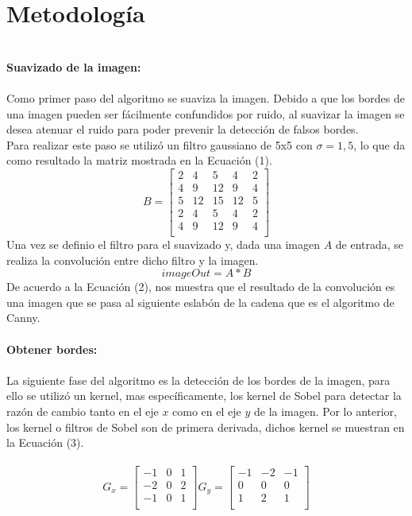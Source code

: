 \documentclass[conference]{IEEEtran}
\begin{document}
\section{Metodolog\'ia}
\textbf{\\ Suavizado de la imagen:\\\\}
Como primer paso del algoritmo se suaviza la imagen. Debido a que los bordes de una imagen pueden ser f\'acilmente confundidos por ruido, al suavizar la imagen se desea atenuar el ruido para poder prevenir la detecci\'on de falsos bordes.\\
Para realizar este paso se utiliz\'o un filtro gaussiano de 5x5 con $\sigma = 1,5$, lo que da como resultado la matriz mostrada en la Ecuaci\'on (1). \\
\begin{equation}
B =
	\begin{bmatrix}
	 2 & 4 & 5 & 4 & 2 \\
	 4 & 9 & 12 & 9 & 4\\
	 5 & 12 & 15 & 12 & 5 \\
	 2 & 4 & 5 & 4 & 2 \\
	 4 & 9 & 12 & 9 & 4\\
	\end{bmatrix}
\end{equation}
Una vez se definio el filtro para el suavizado y, dada una imagen $A$ de entrada, se realiza la convoluci\'on entre dicho filtro y la imagen.
\begin{equation}
	imageOut = A \ast B
\end{equation}
De acuerdo a la Ecuaci\'on (2), nos muestra que el resultado de la convoluci\'on es una imagen que se pasa al siguiente eslab\'on de la cadena que es el algoritmo de Canny.\\
\textbf{\\ Obtener bordes:\\\\}
La siguiente fase del algoritmo es la detecci\'on de los bordes de la imagen, para ello se utiliz\'o un kernel, mas espec\'ificamente, los kernel de Sobel para detectar la raz\'on de cambio tanto en el eje $x$ como en el eje $y$ de la imagen. Por lo anterior, los kernel o filtros de Sobel son de primera derivada, dichos kernel se muestran en la Ecuaci\'on (3).\\\\
\begin{equation}
G_x = 
	\begin{bmatrix}
		-1 & 0 & 1 \\
		-2 & 0 & 2 \\
		-1 & 0 & 1 \\
	\end{bmatrix}
G_y = 
	\begin{bmatrix}
		-1 & -2 & -1 \\
		0 & 0 & 0 \\
		1 & 2 & 1 \\
	\end{bmatrix}
\end{equation}
\end{document}
